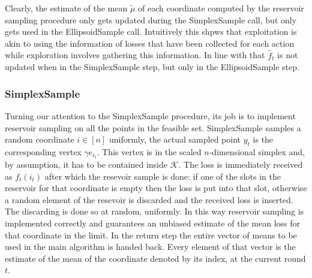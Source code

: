 
Clearly, the estimate of the mean $\tilde{\mu}$ of each coordinate computed by the reservoir sampling procedure only gets updated during the SimplexSample call, but only gets used in the EllipsoidSample call. Intuitively this shpws that exploitation is akin to using the information of losses that have been collected for each action while exploration involves gathering this information. In line with that $\tilde{f_t}$ is not updated when in the SimplexSample step, but only in the EllipsoidSample step. 

\subsubsection{SimplexSample}
Turning our attention to the SimplexSample procedure, its job is to implement reservoir sampling on all the points in the feasible set. SimplexSample samples a random coordinate $i \in [n]$ uniformly, the actual sampled point $y_t$ is the corresponding vertex $\gamma e_{i_t}$. This vertex is in the scaled $n$-dimensional simplex and, by assumption, it has to be contained inside $\mathcal{K}$. The loss is immediately received as $f_t(i_t)$ after which the resevoir sample is done: if one of the slots in the reservoir for that coordinate is empty then the loss is put into that slot, otherwise a random element of the resevoir is discarded and the received loss is inserted. The discarding  is done so at random, uniformly. In this way reservoir sampling is implemented correctly and guarantees an unbiased estimate of the mean loss for that coordinate in the limit. In the return step the entire vector of means to be used in the main algorithm is handed back. Every element of that vector is the estimate of the mean of the coordinate denoted by its index, at the current round $t$.
 
